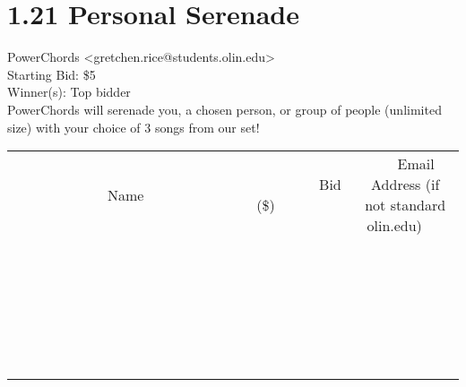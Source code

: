 \documentclass[11pt]{article}
\begin{document}
					\section*{1.21 Personal Serenade}
					PowerChords <gretchen.rice@students.olin.edu> \\
					Starting Bid: \$5 \\
					Winner(s): Top bidder \\
					PowerChords will serenade you, a chosen person, or group of people (unlimited size) with your choice of 3 songs from our set! \\
					[6ex]
					\begin{tabular}{c c c}
						~~~~~~~~~~~~~Name~~~~~~~~~~~~~ & ~~~~~~~~~Bid (\$)~~~~~~~~~ & ~~~Email Address (if not standard olin.edu)~~~ \\
				
 & & \\
\hline
 & & \\
\hline
 & & \\
\hline
 & & \\
\hline
 & & \\
\hline
 & & \\
\hline
 & & \\
\hline
 & & \\
\hline
 & & \\
\hline
 & & \\
\hline
 & & \\
\hline
 & & \\
\hline
 & & \\
\hline
 & & \\
\hline
 & & \\
\hline
 & & \\
\hline
 & & \\
\hline
 & & \\
\hline
 & & \\
\hline
 & & \\
\hline
 & & \\
\hline
 & & \\
\hline
 & & \\
\hline
 & & \\
\hline
 & & \\
\hline
 & & \\
\hline
					\end{tabular}
					\clearpage
				
\end{document}
